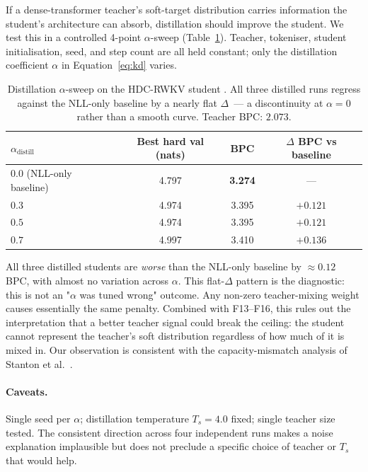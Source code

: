 \documentclass[runningheads]{llncs}
\begin{document}
If a dense-transformer teacher's soft-target distribution carries
information the student's architecture can absorb, distillation
should improve the student. We test this in a controlled 4-point
$\alpha$-sweep (Table~\ref{tab:f17-distill}). Teacher, tokeniser,
student initialisation, seed, and step count are all held constant;
only the distillation coefficient $\alpha$ in Equation~\ref{eq:kd}
varies.

\begin{table}[h]
\centering
\caption{Distillation $\alpha$-sweep on the HDC-RWKV student
. All three distilled runs regress against the NLL-only
baseline by a nearly flat $\Delta$~--- a discontinuity at $\alpha=0$
rather than a smooth curve. Teacher BPC: $2.073$.}
\label{tab:f17-distill}
\small
\begin{tabular}{@{}lccc@{}}
\toprule
$\alpha_{\mathrm{distill}}$ & Best hard val (nats) & BPC & $\Delta$ BPC vs baseline \\
\midrule
$0.0$ (NLL-only baseline)   & 4.797 & \textbf{3.274} & --- \\
$0.3$                        & 4.974 & 3.395 & $+0.121$ \\
$0.5$                        & 4.974 & 3.395 & $+0.121$ \\
$0.7$                        & 4.997 & 3.410 & $+0.136$ \\
\bottomrule
\end{tabular}
\end{table}

All three distilled students are \emph{worse} than the NLL-only
baseline by ${\approx}0.12$ BPC, with almost no variation across
$\alpha$. This flat-$\Delta$ pattern is the diagnostic: this is not
an "$\alpha$ was tuned wrong" outcome. Any non-zero teacher-mixing
weight causes essentially the same penalty. Combined with F13--F16,
this rules out the interpretation that a better teacher signal could
break the ceiling: the student cannot represent the teacher's soft
distribution regardless of how much of it is mixed in. Our
observation is consistent with the capacity-mismatch analysis of
Stanton et al.~\cite{stanton2021does}.

\paragraph{Caveats.} Single seed per $\alpha$; distillation
temperature $T_{\!s}=4.0$ fixed; single teacher size tested. The
consistent direction across four independent runs makes a noise
explanation implausible but does not preclude a specific choice of
teacher or $T_{\!s}$ that would help.
\end{document}
